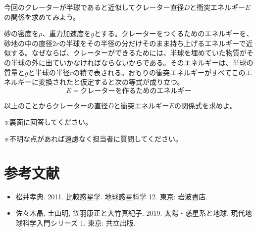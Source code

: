 \documentclass[a4paper]{ltjsarticle}
\begin{document}
今回のクレーターが半球であると近似してクレーター直径$D$と衝突エネルギー$E$の関係を求めてみよう。

砂の密度を$\rho$、重力加速度を$g$とする。クレーターをつくるためのエネルギーを、砂地の中の直径$2r$の半球をその半径の分だけそのまま持ち上げるエネルギーで近似する。なぜならば、クレーターができるためには、半球を埋めていた物質がその半球の外に出ていかなければならないからである。そのエネルギーは、半球の質量と$g$と半球の半径$r$の積で表される。おもりの衝突エネルギーがすべてこのエネルギーに変換されたと仮定すると次の等式が成り立つ。
\begin{equation}
    E = クレーターを作るためのエネルギー
\end{equation}

以上のことからクレーターの直径$D$と衝突エネルギー$E$の関係式を求めよ。

※裏面に回答してください。

※不明な点があれば遠慮なく担当者に質問してください。

\section*{参考文献}

\begin{itemize}
    \item 松井孝典. 2011. 比較惑星学. 地球惑星科学 12. 東京: 岩波書店.
    \item 佐々木晶, 土山明, 笠羽康正と大竹真紀子. 2019. 太陽・惑星系と地球. 現代地球科学入門シリーズ 1. 東京: 共立出版.
\end{itemize}
\end{document}
